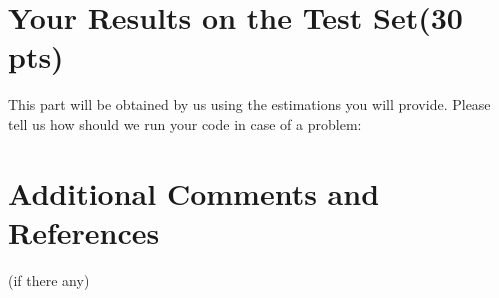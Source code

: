 \documentclass[12pt]{article}
\begin{document}
\section{Your Results on the Test Set(30 pts)}
This part will be obtained by us using the estimations you will provide. Please tell us how should we run your code in case of a problem:

\section{Additional Comments and References}

    (if there any)
\end{document}
